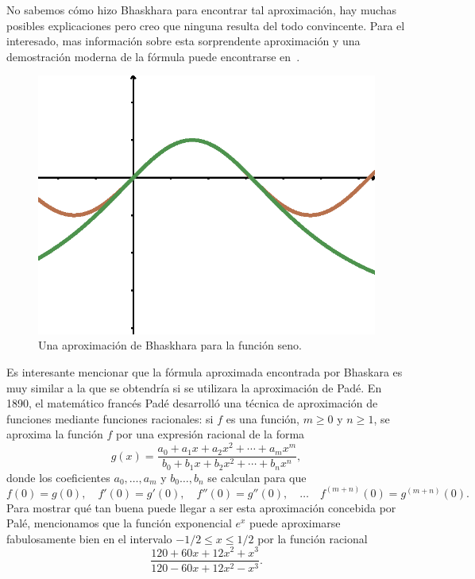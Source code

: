 No sabemos cómo hizo Bhaskhara para encontrar tal
aproximación, hay muchas posibles explicaciones pero creo que ninguna resulta
del todo convincente. Para el interesado, mas información sobre esta
sorprendente aproximación y una demostración moderna de la fórmula puede
encontrarse en~\cite{MR1108101,MR2793182}.

\begin{figure}[h]
   \centering
   \includegraphics[scale=0.6]{images/baskhara}
   \caption{Una aproximación de Bhaskhara para la función seno.}
   \label{fig:baskhara}
\end{figure}

Es interesante mencionar que la fórmula aproximada encontrada por Bhaskara es
muy similar a la que se obtendría si se utilizara la aproximación de Padé. En
1890, el matemático francés Padé desarrolló una técnica de aproximación de
funciones mediante funciones racionales: si $f$ es una función, $m\geq0$ y
$n\geq1$, se aproxima la función $f$ por una expresión racional de la forma
\[
	g(x)=\frac{a_0+a_1x+a_2x^2+\cdots+a_mx^m}{b_0+b_1x+b_2x^2+\cdots+b_nx^n},
\]
donde los coeficientes $a_0,\dots,a_m$ y $b_0\dots,b_n$ se calculan para que
\[
	f(0)=g(0),\quad
	f'(0)=g'(0),\quad
	f''(0)=g''(0),\quad
	\dots
	\quad
	f^{(m+n)}(0)=g^{(m+n)}(0).
\]
Para mostrar qué tan buena puede llegar a ser esta aproximación concebida por
Palé, mencionamos que la función exponencial $e^x$ puede aproximarse fabulosamente
bien en el intervalo $-1/2\leq x\leq 1/2$ por la función racional
\[
	\frac{120+60x+12x^2+x^3}{120-60x+12x^2-x^3}.
\]

